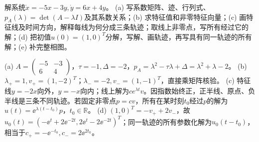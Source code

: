 \begin{exercise}\label{cw:rec22-1}
解系统$\dot x=-5x-3y,\dot y=6x+4y$。
(a) 写系数矩阵、迹、行列式、$p_A(\lambda)=\det(A-\lambda I)$及其系数关系；(b) 求特征值和非零特征向量；(c) 画特征线及时间方向，解释每线为何分成三条轨迹；取线上非零点，写所有经过它的解；(d) 把初值$u(0)=(1,0)^T$分解，写解、画轨迹，再写具有同一轨迹的所有解；(e) 补完整相图。
\end{exercise}
\begin{solution}
(a) $A=\begin{pmatrix}-5&-3\\6&4\end{pmatrix}$，$\tau=-1,\Delta=-2$，$p_A=\lambda^2-\tau\lambda+\Delta=\lambda^2+\lambda-2$。
(b) $\lambda_+=1,v_+=(1,-2)^T$；$\lambda_-=-2,v_-=(1,-1)^T$，直接乘矩阵核验。
(c) 特征线$y=-2x$向外，$y=-x$向内；线上解为$ce^{\lambda t}v$。因指数始终正，正半线、原点、负半线是三条不同轨迹。若固定非零点$p=cv$，所有在某时刻$t_0$经过$p$的解为$u(t)=\ee^{\lambda(t-t_0)}p$，$t_0\in\mathbb R$。
(d) $(1,0)^T=-v_++2v_-$，故 $u_0(t)=(-\ee^t+2\ee^{-2t},2\ee^t-2\ee^{-2t})^T$；同一轨迹的所有参数化解为$u_0(t-t_0)$，相当于$c_+=-\ee^{-t_0},c_-=2\ee^{2t_0}$。

\end{solution}

